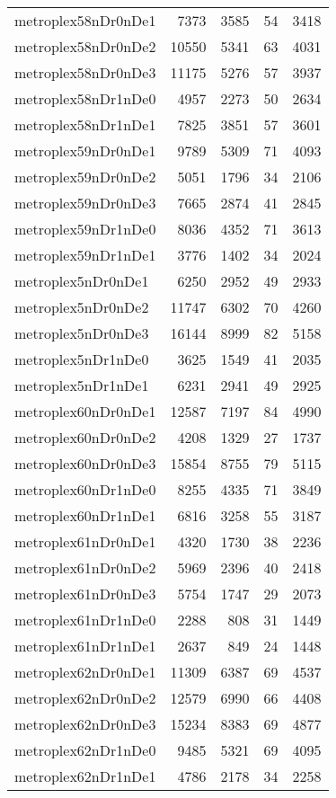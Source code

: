 \begin{longtable}{lrrrr}
metroplex58nDr0nDe1 & 7373 & 3585 & 54 & 3418 \\
metroplex58nDr0nDe2 & 10550 & 5341 & 63 & 4031 \\
metroplex58nDr0nDe3 & 11175 & 5276 & 57 & 3937 \\
metroplex58nDr1nDe0 & 4957 & 2273 & 50 & 2634 \\
metroplex58nDr1nDe1 & 7825 & 3851 & 57 & 3601 \\
metroplex59nDr0nDe1 & 9789 & 5309 & 71 & 4093 \\
metroplex59nDr0nDe2 & 5051 & 1796 & 34 & 2106 \\
metroplex59nDr0nDe3 & 7665 & 2874 & 41 & 2845 \\
metroplex59nDr1nDe0 & 8036 & 4352 & 71 & 3613 \\
metroplex59nDr1nDe1 & 3776 & 1402 & 34 & 2024 \\
metroplex5nDr0nDe1 & 6250 & 2952 & 49 & 2933 \\
metroplex5nDr0nDe2 & 11747 & 6302 & 70 & 4260 \\
metroplex5nDr0nDe3 & 16144 & 8999 & 82 & 5158 \\
metroplex5nDr1nDe0 & 3625 & 1549 & 41 & 2035 \\
metroplex5nDr1nDe1 & 6231 & 2941 & 49 & 2925 \\
metroplex60nDr0nDe1 & 12587 & 7197 & 84 & 4990 \\
metroplex60nDr0nDe2 & 4208 & 1329 & 27 & 1737 \\
metroplex60nDr0nDe3 & 15854 & 8755 & 79 & 5115 \\
metroplex60nDr1nDe0 & 8255 & 4335 & 71 & 3849 \\
metroplex60nDr1nDe1 & 6816 & 3258 & 55 & 3187 \\
metroplex61nDr0nDe1 & 4320 & 1730 & 38 & 2236 \\
metroplex61nDr0nDe2 & 5969 & 2396 & 40 & 2418 \\
metroplex61nDr0nDe3 & 5754 & 1747 & 29 & 2073 \\
metroplex61nDr1nDe0 & 2288 & 808 & 31 & 1449 \\
metroplex61nDr1nDe1 & 2637 & 849 & 24 & 1448 \\
metroplex62nDr0nDe1 & 11309 & 6387 & 69 & 4537 \\
metroplex62nDr0nDe2 & 12579 & 6990 & 66 & 4408 \\
metroplex62nDr0nDe3 & 15234 & 8383 & 69 & 4877 \\
metroplex62nDr1nDe0 & 9485 & 5321 & 69 & 4095 \\
metroplex62nDr1nDe1 & 4786 & 2178 & 34 & 2258 \\

\end{longtable}
